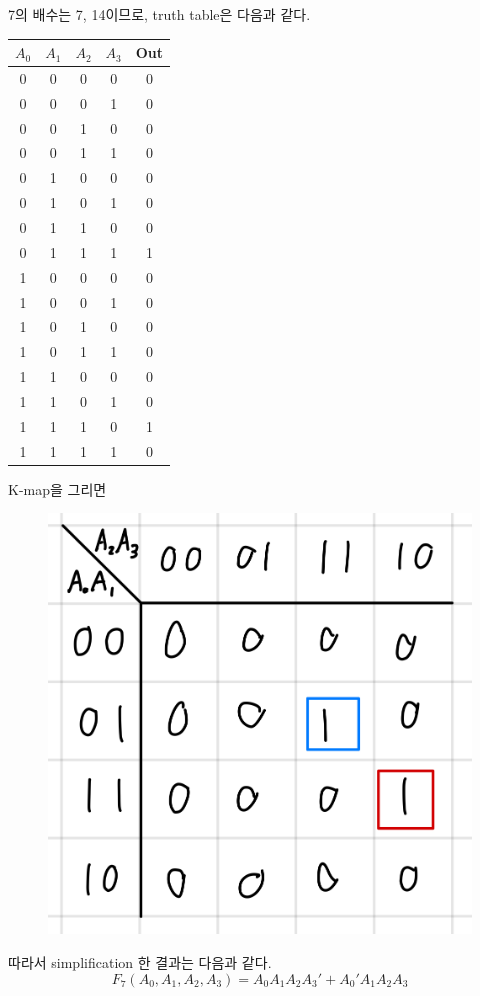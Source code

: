 \documentclass{scrartcl}
\begin{document}
7의 배수는 7, 14이므로, truth table은 다음과 같다.
\begin{table}[H]
  \centering
  \begin{tabular}{|cccc|c|}
    \hline
    \(A_0\) & \(A_1\) & \(A_2\) & \(A_3\) & Out \\
    \hline
    0       & 0       & 0       & 0       & 0   \\
    0       & 0       & 0       & 1       & 0   \\
    0       & 0       & 1       & 0       & 0   \\
    0       & 0       & 1       & 1       & 0   \\
    0       & 1       & 0       & 0       & 0   \\
    0       & 1       & 0       & 1       & 0   \\
    0       & 1       & 1       & 0       & 0   \\
    0       & 1       & 1       & 1       & 1   \\
    1       & 0       & 0       & 0       & 0   \\
    1       & 0       & 0       & 1       & 0   \\
    1       & 0       & 1       & 0       & 0   \\
    1       & 0       & 1       & 1       & 0   \\
    1       & 1       & 0       & 0       & 0   \\
    1       & 1       & 0       & 1       & 0   \\
    1       & 1       & 1       & 0       & 1   \\
    1       & 1       & 1       & 1       & 0   \\
    \hline
  \end{tabular}
\end{table}
K-map을 그리면
\begin{figure}[H]
  \centering
  \includegraphics[width=0.3\linewidth]{lab3_2_7_km}
\end{figure}
따라서 simplification 한 결과는 다음과 같다.
\[
  F_7(A_0, A_1, A_2, A_3) = A_0 A_1 A_2 A_3' + A_0' A_1 A_2 A_3
\]
\end{document}
